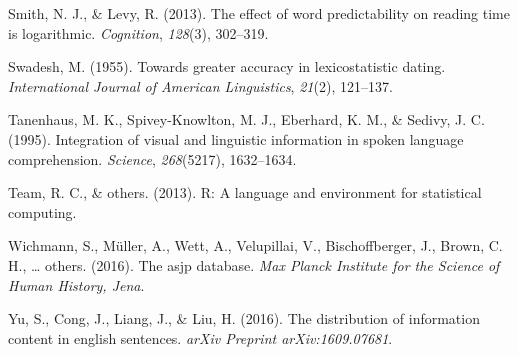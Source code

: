 \documentclass[man,floatsintext]{apa6}
\begin{document}
\leavevmode\hypertarget{ref-smith2013}{}%
Smith, N. J., \& Levy, R. (2013). The effect of word predictability on reading time is logarithmic. \emph{Cognition}, \emph{128}(3), 302--319.

\leavevmode\hypertarget{ref-swadesh1955}{}%
Swadesh, M. (1955). Towards greater accuracy in lexicostatistic dating. \emph{International Journal of American Linguistics}, \emph{21}(2), 121--137.

\leavevmode\hypertarget{ref-tanenhaus1995}{}%
Tanenhaus, M. K., Spivey-Knowlton, M. J., Eberhard, K. M., \& Sedivy, J. C. (1995). Integration of visual and linguistic information in spoken language comprehension. \emph{Science}, \emph{268}(5217), 1632--1634.

\leavevmode\hypertarget{ref-team2013}{}%
Team, R. C., \& others. (2013). R: A language and environment for statistical computing.

\leavevmode\hypertarget{ref-wichmann2016}{}%
Wichmann, S., Müller, A., Wett, A., Velupillai, V., Bischoffberger, J., Brown, C. H., \ldots{} others. (2016). The asjp database. \emph{Max Planck Institute for the Science of Human History, Jena}.

\leavevmode\hypertarget{ref-yu2016}{}%
Yu, S., Cong, J., Liang, J., \& Liu, H. (2016). The distribution of information content in english sentences. \emph{arXiv Preprint arXiv:1609.07681}.

\endgroup
\end{document}
